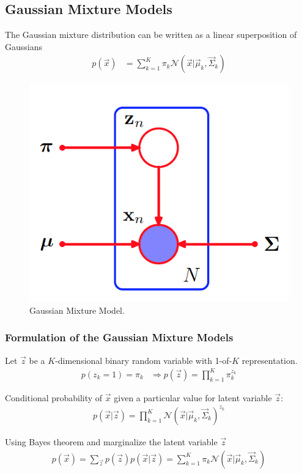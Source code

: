 \documentclass[12pt,twoside]{article}
\begin{document}
\subsection{Gaussian Mixture Models}
The Gaussian mixture distribution can be written as a linear superposition of Gaussians
\begin{align*}
	p(\vec{x}) &= \sum_{k=1}^K \pi_k \mathcal{N}(\vec{x}\vert \vec{\mu}_k, \vec{\Sigma}_k)
\end{align*}

\begin{figure}[H]
	\begin{center}
		\includegraphics[width = 0.4\hsize]{./figures/GMM.png} 
		\caption{Gaussian Mixture Model.} %
		\label{fig:GMM} %
	\end{center}
\end{figure}


\subsubsection{Formulation of the Gaussian Mixture Models}
Let $\vec{z}$ be a $K$-dimensional binary random variable with 1-of-$K$ representation.
\begin{align*}
	p(z_k=1) = \pi_k 	&\Rightarrow p(\vec{z})=\prod_{k=1}^K \pi_k^{z_k}
\end{align*}

Conditional probability of $\vec{x}$ given a particular value for latent variable $\vec{z}$:
\begin{align*}
	p(\vec{x}\vert \vec{z}) = \prod_{k=1}^K \mathcal{N}(\vec{x}\vert \vec{\mu}_k, \vec{\Sigma}_k)^{z_k}
\end{align*}

Using Bayes theorem and marginalize the latent variable $\vec{z}$
\begin{align*}
	p(\vec{x}) =\sum_{\vec{z}}p(\vec{z})p(\vec{x}\vert \vec{z}) = \sum_{k=1}^K \pi_k\mathcal{N}(\vec{x}\vert \vec{\mu}_k, \vec{\Sigma}_k)
\end{align*}
\end{document}
